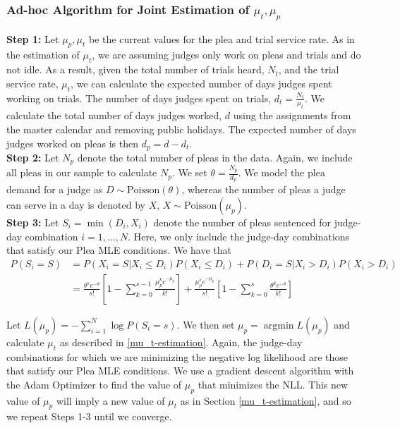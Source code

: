 \documentclass[11pt]{article}
\DeclareMathOperator*{\argmin}{argmin}
\theoremstyle{ModifiedStyle}
\begin{document}
    \subsubsection{Ad-hoc Algorithm for Joint Estimation of $\mu_t,\mu_p$}
      \textbf{Step 1:} Let $\mu_p,\mu_t$ be the current values for the plea and trial service rate. As in the estimation of $\mu_t$, we are assuming judges only work on pleas and trials and do not idle. As a result, given the total number of trials heard, $N_{t}$, and the trial service rate, $\mu_t$, we can calculate the expected number of days judges spent working on trials. The number of days judges spent on trials, $d_{t} = \frac{N_{t}}{\mu_t}$. We calculate the total number of days judges worked, $d$ using the assignments from the master calendar and removing public holidays. The expected number of days judges worked on pleas is then $d_{p} = d - d_{t}$. \\

      \noindent \textbf{Step 2:} Let $N_p$ denote the total number of pleas in the data. Again, we include all pleas in our sample to calculate $N_p$. We set $\theta = \frac{N_p}{d_p}$. We model the plea demand for a judge as $D \sim \text{Poisson}(\theta)$, whereas the number of pleas a judge can serve in a day is denoted by $X$, $X \sim \text{Poisson}(\mu_p)$. \\

      \noindent \textbf{Step 3:} Let $S_i = \min(D_i,X_i)$ denote the number of pleas sentenced for judge-day combination $i=1,...,N$. Here, we only include the judge-day combinations that satisfy our Plea MLE conditions. We have that
			\begin{align*}
				P(S_i = S) &= P(X_i = S | X_i \leq D_i) P(X_i \leq D_i) + P(D_i = S | X_i > D_i) P(X_i > D_i) \\
          &= \frac{\theta^s e^{-\theta}}{s!}[1-\sum_{k=0}^{s-1}\frac{\mu_p^k e^{-\mu_p}}{k!}] + \frac{\mu_p^s e^{-\mu_p}}{s!}[1-\sum_{k=0}^s \frac{\theta^k e^{-\theta}}{k!}]
			\end{align*}

      Let $L(\mu_p) = -\sum_{i=1}^N \log P(S_i = s)$. We then set
			 $\mu_p = \argmin L(\mu_p)$ and calculate $\mu_t$ as described in \ref{mu_t-estimation}. Again, the judge-day combinations for which we are minimizing the negative log likelihood are those that satisfy our Plea MLE conditions. We use a gradient descent algorithm with the Adam Optimizer to find the value of $\mu_p$ that minimizes the NLL. This new value of $\mu_p$ will imply a new value of $\mu_t$ as in Section \ref{mu_t-estimation}, and so we repeat Steps 1-3 until we converge.
\end{document}
